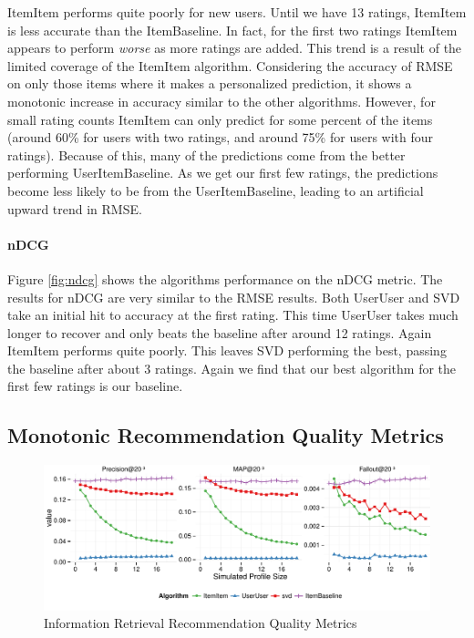 \documentclass[letterpaper]{sig-alternate}
\begin{document}
  ItemItem performs quite poorly for new users.
  Until we have 13 ratings, ItemItem is less accurate than the ItemBaseline.
  In fact, for the first two ratings ItemItem appears to perform \emph{worse} as more ratings are added.
  This trend is a result of the limited coverage of the ItemItem algorithm.
  Considering the accuracy of RMSE on only those items where it makes a personalized prediction, it shows a monotonic increase in accuracy similar to the other algorithms.
  However, for small rating counts ItemItem can only predict for some percent of the items (around 60\% for users with two ratings, and around 75\% for users with four ratings).
  Because of this, many of the predictions come from the better performing UserItemBaseline.
  As we get our first few ratings, the predictions become less likely to be from the UserItemBaseline, leading to an artificial upward trend in RMSE.
  

  \vspace{-0.5em}
  \paragraph{nDCG}
  Figure \ref{fig:ndcg} shows the algorithms performance on the nDCG metric.
  The results for nDCG are very similar to the RMSE results.
  Both UserUser and SVD take an initial hit to accuracy at the first rating.
  This time UserUser takes much longer to recover and only beats the baseline after around 12 ratings.
  Again ItemItem performs quite poorly.
  This leaves SVD performing the best, passing the baseline after about 3 ratings.
  Again we find that our best algorithm for the first few ratings is our baseline.
  


\subsection*{Monotonic Recommendation Quality Metrics}

\vspace{-1.5em}

\begin{figure}[ht!]
  \centering
  \includegraphics[width=\linewidth]{../lenskit/output/ekstrandTuned20/TopNPrecision.pdf}
  \caption{Information Retrieval Recommendation Quality Metrics}
  \label{fig:map}
\end{figure}
%
\end{document}
